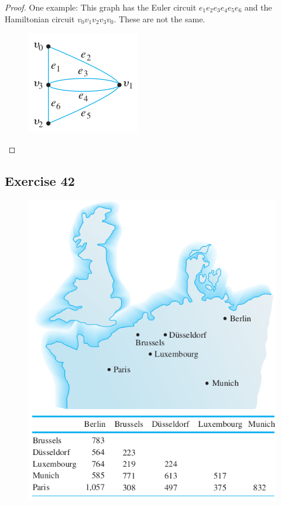 \documentclass[14pt]{extarticle}
\begin{document}
\begin{proof}
One example: This graph has the Euler circuit \(e_1e_2e_3e_4e_5e_6\) and the Hamiltonian circuit 
\(v_0v_1v_2v_3v_0\). These are not the same.

\begin{figure}[ht!]
\centering
\includegraphics[scale=0.6]{../images/10.1.41.png}
\end{figure}
\end{proof}

\subsection{Exercise 42}
\begin{figure}[ht!]
\centering
\includegraphics[scale=0.45]{../images/10.1.42.png}
\end{figure}
\end{document}
